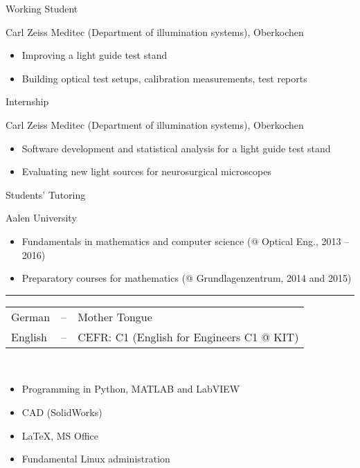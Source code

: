 \documentclass[a4paper,10pt]{article}
\newlength{\cvcolumngapwidth}
\newlength{\cvleftcolumnwidth}
\newlength{\cvrightcolumnwidth}
\newcommand{\cvsectionstyle}[1]{{\normalsize\textcolor{cvsectioncolor}{#1}}}
\newcommand{\cvtitlestyle}[1]{{\large\textcolor{cvtitlecolor}{#1}}}
\newcommand{\cvdurationstyle}[1]{{\small\textcolor{cvdurationcolor}{#1}}}
\newcommand{\cvheadingstyle}[1]{{\normalsize\textcolor{cvheadingcolor}{#1}}}
\newlength{\cvafteritemskipamount}
\newlength{\cvaftersectionskipamount}
\newlength{\cvbetweensectionandheadingextraskipamount}
\newlength{\cvaftertitleskipamount}
\newlength{\cvparskip}
\newcommand{\cvsection}[1]{
    \begin{minipage}[t][][b]{\cvleftcolumnwidth}
        \raggedleft\cvsectionstyle{#1}
    \end{minipage}%
    \hspace{\cvcolumngapwidth}%
    \begin{minipage}[t]{\cvrightcolumnwidth}
        \textcolor{cvrulecolor}{\rule{\cvrightcolumnwidth}{0.3mm}}
    \end{minipage}

    \vspace{\cvaftersectionskipamount}
}
\newcommand{\cvitem}[2]{
    \begin{minipage}[t]{\cvleftcolumnwidth}
    \strut\vspace*{-\baselineskip}\newline %
    \raggedleft #1
    \end{minipage}%
    \hspace{\cvcolumngapwidth}%
    \begin{minipage}[t]{\cvrightcolumnwidth}
        \setlength{\parskip}{\cvparskip}
        \strut\vspace*{-\baselineskip}\newline #2 %
    \end{minipage}

    \vspace{\cvafteritemskipamount}
}
\newcommand{\cvtitle}[1]{
    \cvtitlestyle{#1}

    \vspace{\cvaftertitleskipamount}
    \vspace{-\cvparskip}
}
\begin{document}
\cvitem{\cvdurationstyle{March 2015 -- July 2015}}{\cvtitle{Working Student}
    Carl Zeiss Meditec (Department of illumination systems), Oberkochen
    \begin{itemize}[leftmargin=*]
        \item Improving a light guide test stand
        \item Building optical test setups, calibration measurements, test reports
    \end{itemize}
}

\cvitem{\cvdurationstyle{September 2014 -- February 2015}}{\cvtitle{Internship}
    Carl Zeiss Meditec (Department of illumination systems), Oberkochen
    \begin{itemize}[leftmargin=*]
        \item Software development and statistical analysis for a light guide test stand
        \item Evaluating new light sources for neurosurgical microscopes 
    \end{itemize}
}

\cvitem{\cvdurationstyle{2013 -- 2016}}{\cvtitle{Students' Tutoring}
    Aalen University
    \begin{itemize}[leftmargin=*]
        \item Fundamentals in mathematics and computer science (@ Optical Eng., 2013 -- 2016)
        \item Preparatory courses for mathematics (@ Grundlagenzentrum, 2014 and 2015)
    \end{itemize}
}

\cvsection{SKILLS}

\cvitem{\cvheadingstyle{Languages}}{
    \hspace*{-2mm}\begin{tabular}{lcl}
    German  & -- & Mother Tongue \\
    English & -- & CEFR: C1 (English for Engineers C1 @  KIT) \\
    \end{tabular}
}

\cvitem{\cvheadingstyle{Computer skills}}{
    \\[-5.5ex]\begin{itemize}[leftmargin=*]
    	\item Programming in Python, MATLAB and LabVIEW
    	\item CAD (SolidWorks)
    	\item \LaTeX, MS Office
    	\item Fundamental Linux administration
    \end{itemize}
}
\end{document}
